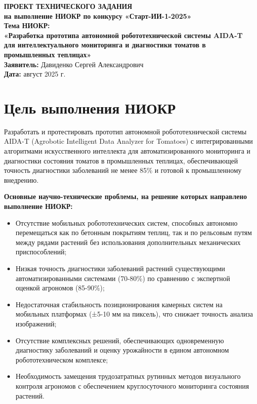 \documentclass[12pt,a4paper]{article}
\begin{document}
\begin{center}
\textbf{\Large ПРОЕКТ ТЕХНИЧЕСКОГО ЗАДАНИЯ} \\
\textbf{\Large на выполнение НИОКР по конкурсу «Старт-ИИ-1-2025»} \\[1em]
\textbf{\large Тема НИОКР:} \\
\textbf{\large «Разработка прототипа автономной робототехнической системы AIDA-T для интеллектуального мониторинга и диагностики томатов в промышленных теплицах»} \\[1em]
\textbf{Заявитель:} Давиденко Сергей Александрович \\
\textbf{Дата:} август 2025 г.
\end{center}

\newpage

\tableofcontents
\newpage

\section{Цель выполнения НИОКР}

Разработать и протестировать прототип автономной робототехнической системы AIDA-T (Agrobotic Intelligent Data Analyzer for Tomatoes) с интегрированными алгоритмами искусственного интеллекта для автоматизированного мониторинга и диагностики состояния томатов в промышленных теплицах, обеспечивающей точность диагностики заболеваний не менее 85\% и готовой к промышленному внедрению.

\textbf{Основные научно-технические проблемы, на решение которых направлено выполнение НИОКР:}

\begin{itemize}
\item Отсутствие мобильных робототехнических систем, способных автономно перемещаться как по бетонным покрытиям теплиц, так и по рельсовым путям между рядами растений без использования дополнительных механических приспособлений;
\item Низкая точность диагностики заболеваний растений существующими автоматизированными системами (70-80\%) по сравнению с экспертной оценкой агрономов (85-90\%);
\item Недостаточная стабильность позиционирования камерных систем на мобильных платформах (±5-10 мм на пиксель), что снижает точность анализа изображений;
\item Отсутствие комплексных решений, обеспечивающих одновременную диагностику заболеваний и оценку урожайности в едином автономном робототехническом комплексе;
\item Необходимость замещения трудозатратных рутинных методов визуального контроля агрономов с обеспечением круглосуточного мониторинга состояния растений.
\end{itemize}
\end{document}
